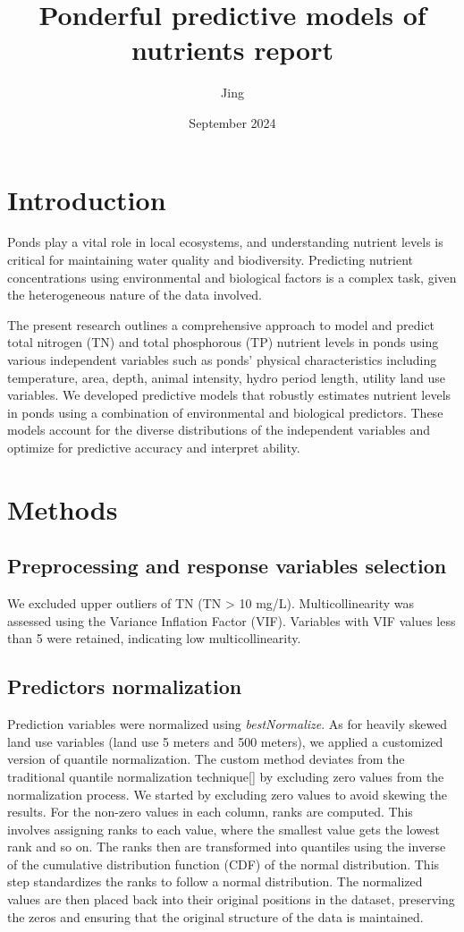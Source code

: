 \documentclass{article}
\title{Ponderful predictive models of nutrients report 
}
\author{Jing}
\date{September 2024}
\begin{document}
\maketitle

\section{Introduction}

Ponds play a vital role in local ecosystems, and understanding nutrient levels is critical for maintaining water quality and biodiversity. Predicting nutrient concentrations using environmental and biological factors is a complex task, given the heterogeneous nature of the data involved.

The present research outlines a comprehensive approach to model and predict total nitrogen (TN) and total phosphorous (TP) nutrient levels in ponds using various independent variables such as ponds’ physical characteristics including temperature, area, depth, animal intensity, hydro period length, utility land use variables. We developed predictive models that robustly estimates nutrient levels in ponds using a combination of environmental and biological predictors. These models account for the diverse distributions of the independent variables and optimize for predictive accuracy and interpret ability.

\section{Methods}

\subsection{Preprocessing and response variables selection}

We excluded upper outliers of TN (TN > 10 mg/L). Multicollinearity was assessed using the Variance Inflation Factor (VIF). Variables with VIF values less than 5 were retained, indicating low multicollinearity.


\subsection{Predictors normalization}

Prediction variables were normalized using \textit{bestNormalize}. As for heavily skewed land use variables (land use 5 meters and 500 meters), we applied a customized version of quantile normalization. The custom method deviates from the traditional quantile normalization technique[] by excluding zero values from the normalization process. We started by excluding zero values to avoid skewing the results. For the non-zero values in each column, ranks are computed. This involves assigning ranks to each value, where the smallest value gets the lowest rank and so on. The ranks then are transformed into quantiles using the inverse of the cumulative distribution function (CDF) of the normal distribution. This step standardizes the ranks to follow a normal distribution. The normalized values are then placed back into their original positions in the dataset, preserving the zeros and ensuring that the original structure of the data is maintained.
\end{document}

